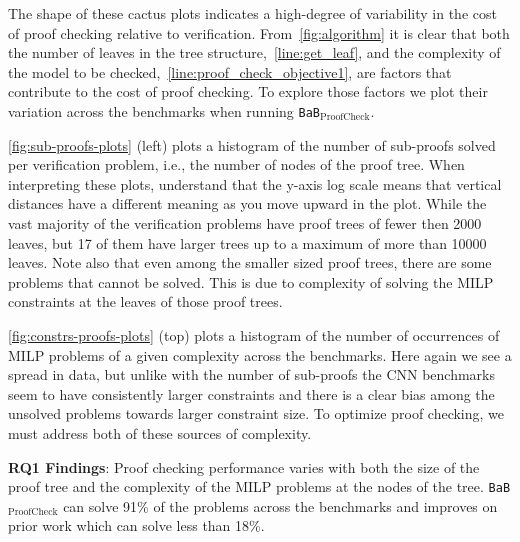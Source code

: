 \documentclass[oneside,11pt,dvipsnames]{book}
\newcommand{\proofcheck}{\texttt{BaB$_{\text{ProofCheck}}$}}
\newcommand{\mycomment}[3][\color{blue}]{{#1{{#2}: {#3}}}}
\newcommand{\tvn}[1]{\mycomment{TVN}{#1}}{}
\begin{document}
The shape of these cactus plots indicates a high-degree of variability in the cost of proof
checking relative to verification.
From~\autoref{fig:algorithm} it is clear that both the number of leaves in the tree
structure,~\autoref{line:get_leaf}, and the complexity of the model to be checked,~\autoref{line:proof_check_objective1}, are factors that contribute to the cost of proof checking.
To explore those factors we plot their variation across the benchmarks when running \proofcheck{}.

\autoref{fig:sub-proofs-plots} (left) plots a histogram of the number of sub-proofs solved per verification 
problem, i.e., the number of nodes of the proof tree.
When interpreting these plots, understand that the y-axis log scale means that vertical
distances have a different meaning as you move upward in the plot.
While the vast majority of the verification problems have proof trees of fewer then 2000 leaves, but 17 of them have larger trees up to a maximum of more than 10000 leaves.
Note also that even among the smaller sized proof trees, there are some problems that cannot be solved.
This is due to complexity of solving the MILP constraints at the leaves of those proof trees.

\autoref{fig:constrs-proofs-plots} (top) plots a histogram of the number of occurrences of MILP problems of
a given complexity across the benchmarks.  Here again we see a spread in data, but unlike with the number of sub-proofs the CNN benchmarks seem to have consistently larger constraints and there is a clear bias among the unsolved problems towards larger constraint size.
To optimize proof checking, we must address both of these sources of complexity.

\begin{tcolorbox}[left=1pt,right=1pt,top=1pt,bottom=1pt]
\textbf{RQ1 Findings}: Proof checking performance varies with both the size of the proof tree and the complexity of the MILP problems at the nodes of the tree.  \proofcheck{} can solve 91\% of the problems across the benchmarks and improves on prior work which can solve less than 18\%.
\end{tcolorbox}
\end{document}

